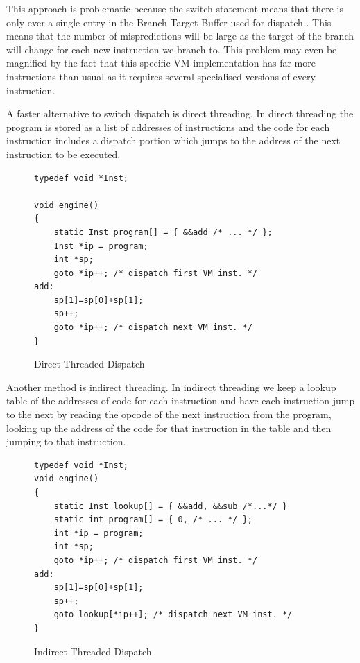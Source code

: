 \documentclass[english,a4paper]{report}
\begin{document}
This approach is problematic because the switch statement means that
there is only ever a single entry in the Branch Target Buffer used for
dispatch . This means that the number of mispredictions will be large
as the target of the branch will change for each new instruction we
branch to. This problem may even be magnified by the fact that this
specific VM implementation has far more instructions than usual as it
requires several specialised versions of every instruction.

A faster alternative to switch dispatch is direct
threading\cite{Ertl}. In direct threading the program is stored as a
list of addresses of instructions and the code for each instruction
includes a dispatch portion which jumps to the address of the next
instruction to be executed.

\begin{figure}
  \begin{lstlisting}
typedef void *Inst; 

void engine() 
{ 
    static Inst program[] = { &&add /* ... */ }; 
    Inst *ip = program; 
    int *sp; 
    goto *ip++; /* dispatch first VM inst. */ 
add: 
    sp[1]=sp[0]+sp[1]; 
    sp++; 
    goto *ip++; /* dispatch next VM inst. */ 
}
  \end{lstlisting}
  \caption{Direct Threaded Dispatch}
  \label{fig:direct}
\end{figure}

Another method is indirect threading. In indirect threading we keep a
lookup table of the addresses of code for each instruction and have
each instruction jump to the next by reading the opcode of the next
instruction from the program, looking up the address of the code for
that instruction in the table and then jumping to that instruction.

\begin{figure}
  \begin{lstlisting}
typedef void *Inst;
void engine() 
{ 
    static Inst lookup[] = { &&add, &&sub /*...*/ }
    static int program[] = { 0, /* ... */ }; 
    int *ip = program; 
    int *sp; 	
    goto *ip++; /* dispatch first VM inst. */ 
add: 
    sp[1]=sp[0]+sp[1]; 
    sp++; 
    goto lookup[*ip++]; /* dispatch next VM inst. */ 
}
  \end{lstlisting}
  \caption{Indirect Threaded Dispatch}
  \label{fig:indirect}
\end{figure}
\end{document}
